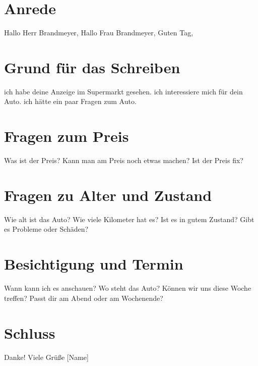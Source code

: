\documentclass[a4paper]{article}
\title{}
\date{}
\begin{document}
    \maketitle
    
    
    \section{Anrede}
        Hallo Herr Brandmeyer,
        Hallo Frau Brandmeyer,
        Guten Tag,
    
    
    \section{Grund für das Schreiben}
        ich habe deine Anzeige im Supermarkt gesehen.
        ich interessiere mich für dein Auto.
        ich hätte ein paar Fragen zum Auto.
    
    
    \section{Fragen zum Preis}
        Was ist der Preis?
        Kann man am Preis noch etwas machen?
        Ist der Preis fix?
    
    
    \section{Fragen zu Alter und Zustand}
        Wie alt ist das Auto?
        Wie viele Kilometer hat es?
        Ist es in gutem Zustand?
        Gibt es Probleme oder Schäden?
    
    
    \section{Besichtigung und Termin}
        Wann kann ich es anschauen?
        Wo steht das Auto?
        Können wir uns diese Woche treffen?
        Passt dir am Abend oder am Wochenende?
    
    
    \section{Schluss}
        Danke!
        Viele Grüße
        [Name]
\end{document}
